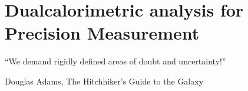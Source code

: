 \documentclass[../main.tex]{subfiles}
\begin{document}
\chapter{Dualcalorimetric analysis for Precision Measurement}
\label{sec:joint_fit}

\epigraph{``We demand rigidly defined areas of doubt and uncertainty!''}{Douglas Adams, The Hitchhiker’s Guide to the Galaxy}

\minitoc

%
%
%
%
%
%
%
\end{document}
